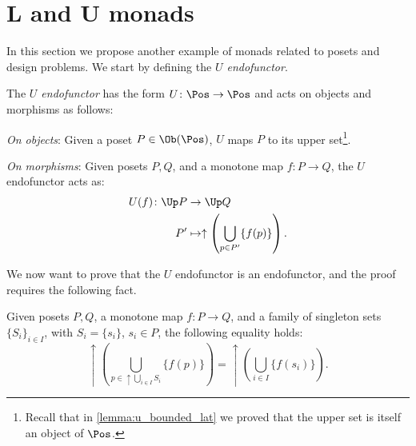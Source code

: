 \section{L and U monads}
In this section we propose another example of monads related to posets and design problems. We start by defining the \emph{$U$ endofunctor}.
\begin{definition}[$U$ endofunctor]
\label{def:ufunctor}
The \emph{$U$ endofunctor} has the form $U\colon \Pos \to \Pos$ and acts on objects and morphisms as follows:
\begin{compactenum}
    \item \emph{On objects}: Given a poset $P\in \Ob(\Pos)$, $U$ maps $P$ to its upper set\footnote{Recall that in \cref{lemma:u_bounded_lat} we proved that the upper set is itself an object of $\Pos$.}.
    \item \emph{On morphisms}: Given posets $P,Q$, and a monotone map $f\colon P\to Q$, the $U$ endofunctor acts as:
    \begin{equation}
        \begin{aligned}
            U(f)\colon \Up P&\to \Up Q\\
            P'&\mapsto \uparrow \left( \bigcup_{p\in P'} \{f(p)\}\right). 
        \end{aligned}
    \end{equation}
\end{compactenum}
\end{definition}
We now want to prove that the $U$ endofunctor is an endofunctor, and the proof requires the following fact.
\begin{lemma}
\label{lemma:unpack_u_functor}
Given posets $P,Q$, a monotone map $f\colon P \to Q$, and a family of singleton sets $\{S_i\}_{i\in I}$, with $S_i=\{s_i\}$, $s_i\in P$, the following equality holds:
\begin{equation}
    \uparrow\left( \bigcup_{p\in \uparrow \bigcup_{i\in I}S_i}\{f(p)\}\right)= \uparrow \left( \bigcup_{i\in I} \{f(s_i)\}\right).
\end{equation}
\end{lemma}
